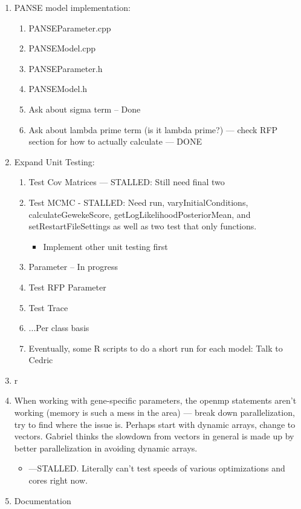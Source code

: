 \documentclass[12pt,hyperref]{labbook}
\newcommand{\sep}{\discretionary{}{}{}} %
\begin{document}
\begin{enumerate}
    \item PANSE model implementation:
    \begin{enumerate}
        \item PANSEParameter.cpp
        \item PANSEModel.cpp
        \item PANSEParameter.h
        \item PANSEModel.h
        \item Ask about sigma term -- Done
        \item Ask about lambda prime term (is it lambda prime?) — check RFP section for how to actually calculate — DONE
    \end{enumerate}
    \item Expand Unit Testing:
    \begin{enumerate}
        \item Test Cov Matrices — STALLED: Still need final two
        \item Test MCMC - STALLED: Need run, vary\sep Initial\sep Conditions, calculate\sep Geweke\sep Score, get\sep Log\sep Likelihood\sep Posterior\sep Mean, and set\sep Restart\sep File\sep Settings as well as two test that only functions.
        \begin{itemize}
            \item Implement other unit testing first
        \end{itemize}
        \item Parameter -- In progress
        \item Test RFP Parameter
        \item Test Trace
        \item ...Per class basis
        \item Eventually, some R scripts to do a short run for each model: Talk to Cedric
    \end{enumerate}
    \item r
    \item When working with gene-specific parameters, the openmp statements aren’t working (memory is such a mess in the area) — break down parallelization, try to find where the issue is. Perhaps start with dynamic arrays, change to vectors. Gabriel thinks the slowdown from vectors in general is made up by better parallelization in avoiding dynamic arrays.
    \begin{itemize}
        \item —STALLED. Literally can’t test speeds of various optimizations and cores right now.
    \end{itemize}
    \item Documentation
\end{enumerate}
\end{document}
